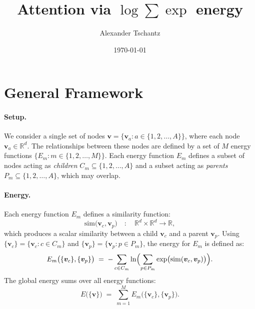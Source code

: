 \documentclass{article}
\begin{document}
\title{Attention via \(\log \sum \exp\) energy}
\author{Alexander Tschantz}
\date{\today}
\maketitle

\section{General Framework}

\paragraph{Setup.}  
We consider a single set of nodes \(\bm{v} = \{\bm{v}_a : a \in \{1, 2, \ldots, A\}\}\), where each node \(\bm{v}_a \in \mathbb{R}^d\). The relationships between these nodes are defined by a set of \(M\) energy functions \(\{E_m : m \in \{1, 2, \ldots, M\}\}\). Each energy function \(E_m\) defines a subset of nodes acting as \emph{children} \(C_m \subseteq \{1, 2, \ldots, A\}\) and a subset acting as \emph{parents} \(P_m \subseteq \{1, 2, \ldots, A\}\), which may overlap.

\paragraph{Energy.}  
Each energy function \(E_m\) defines a similarity function:
\begin{equation}
\mathrm{sim}\bigl(\bm{v}_c, \bm{v}_p\bigr) \quad:\quad \mathbb{R}^d \times \mathbb{R}^d \to \mathbb{R},
\end{equation}
which produces a scalar similarity between a child \(\bm{v}_c\) and a parent \(\bm{v}_p\). Using \( \{ \bm{v}_c \} = \{\bm{v}_c : c \in C_m\}\) and \( \{ \bm{v}_p \} = \{\bm{v}_p : p \in P_m\}\), the energy for \(E_m\) is defined as:
\begin{equation}
E_m\bigl(\{ \bm{v}_c \} , \{ \bm{v}_p \} \bigr)
\;=\;
-\sum_{c \in C_m}
\ln \Bigl(
\sum_{p \in P_m}
\exp\bigl(\mathrm{sim}(\bm{v}_c, \bm{v}_p)\bigr)
\Bigr).
\end{equation}
The global energy sums over all energy functions:
\begin{equation}
E\bigl(\{ \bm{v} \} \bigr)
\;=\;
\sum_{m=1}^M
E_m\bigl(\{ \bm{v}_c \} , \{ \bm{v}_p \} \bigr).
\end{equation}
\end{document}
